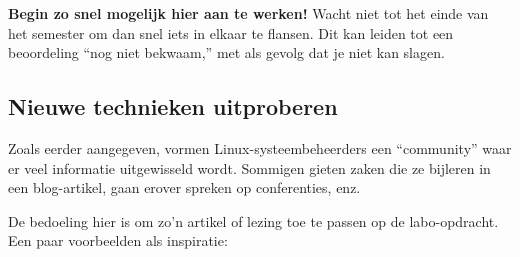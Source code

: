 \textbf{Begin zo snel mogelijk hier aan te werken!} Wacht niet tot het einde van het semester om dan snel iets in elkaar te flansen. Dit kan leiden tot een beoordeling ``nog niet bekwaam,'' met als gevolg dat je niet kan slagen.

\subsection{Nieuwe technieken uitproberen}
\label{subs:nieuwe-technieken-uitproberen}

Zoals eerder aangegeven, vormen Linux-systeembeheerders een ``community'' waar er veel informatie uitgewisseld wordt. Sommigen gieten zaken die ze bijleren in een blog-artikel, gaan erover spreken op conferenties, enz.

De bedoeling hier is om zo'n artikel of lezing toe te passen op de labo-opdracht. Een paar voorbeelden als inspiratie:

